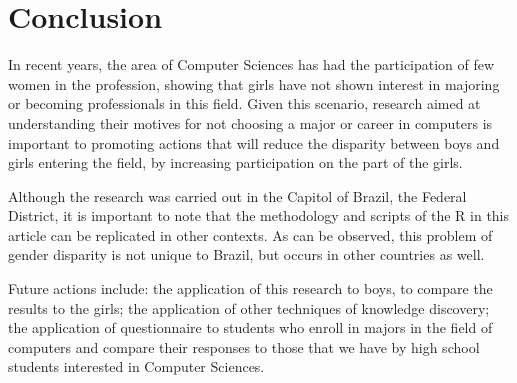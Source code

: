 \section{Conclusion}\label{sec:conclusion}%

In recent years, the area of Computer Sciences has had the participation of few women in the profession, showing that girls have not shown interest in majoring or becoming professionals in this field. Given this scenario, research aimed at understanding their motives for not choosing a major or career in computers is important to promoting actions that will reduce the disparity between boys and girls entering the field, by increasing participation on the part of the girls.

Although the research was carried out in the Capitol of Brazil, the Federal District, it is important to note that the methodology and scripts of the R in this article can be replicated in other contexts. As can be observed, this problem of gender disparity is not unique to Brazil, but occurs in other countries as well.

Future actions include: the application of this research to boys, to compare the results to the girls; the application of other techniques of knowledge discovery; the application of questionnaire to students who enroll in majors in the field of computers and compare their responses to those that we have by high school students interested in Computer Sciences.
